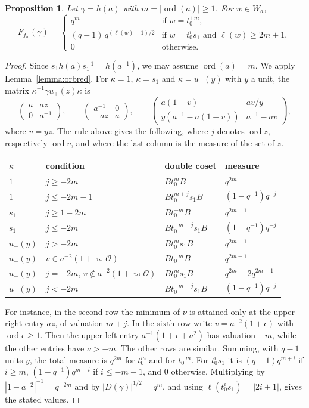 \documentclass[12pt,letterpaper]{amsart}
\numberwithin{equation}{section}
\newtheorem{proposition}[theorem]{Proposition}
\theoremstyle{definition}
\theoremstyle{remark}
\DeclareMathOperator{\ord}{ord}
\newcommand{\cO}{\mathcal{O}}
\newcommand{\mat}[4]{\begin{pmatrix} #1 & #2\\ #3 & #4\end{pmatrix}}
\begin{document}
\begin{proposition}
\label{prop:orbsl2}
Let $\gamma=h(a)$ with $m=|\ord(a)|\geq1$. For $w\in W_a$,
\[
F_{f_w}(\gamma)=
\begin{cases}
q^m & \mbox{if } w=t_0^{\pm m},\\
(q-1)\,q^{(\ell(w)-1)/2} & \mbox{if } w=t_0^is_1 \mbox{ and }
\ell(w)\geq 2m+1,\\
0 & \mbox{otherwise.}
\end{cases}
\]
\end{proposition}

\begin{proof}
Since $s_1h(a)s_1^{-1}=h(a^{-1})$, we may assume $\ord(a)=m$. We apply
Lemma~\ref{lemma:orbred}. For $\kappa=1$, $\kappa=s_1$ and
$\kappa=u_-(y)$ with $y$ a unit, the matrix
$\kappa^{-1}\gamma u_+(z)\kappa$ is
\[
\mat a{az}0{a^{-1}},\qquad \mat{a^{-1}}0{-az}a,\qquad
\mat{a(1+v)}{av/y}{y(a^{-1}-a(1+v))}{a^{-1}-av},
\]
where $v=yz$. The rule above gives the following, where $j$ denotes
$\ord z$, respectively $\ord v$, and where the last column is the
measure of the set of $z$.
\begin{center}
\begin{tabular}{@{}llll@{}}
\toprule
$\kappa$ & condition & double coset & measure \\
\midrule
$1$ & $j\geq -2m$ & $Bt_0^mB$ & $q^{2m}$ \\
$1$ & $j\leq -2m-1$ & $Bt_0^{m+j}s_1B$ & $(1-q^{-1})q^{-j}$ \\
$s_1$ & $j\geq 1-2m$ & $Bt_0^{-m}B$ & $q^{2m-1}$ \\
$s_1$ & $j\leq -2m$ & $Bt_0^{-m-j}s_1B$ & $(1-q^{-1})q^{-j}$ \\
$u_-(y)$ & $j>-2m$ & $Bt_0^ms_1B$ & $q^{2m-1}$ \\
$u_-(y)$ & $v\in a^{-2}(1+\varpi\cO)$ & $Bt_0^{-m}B$ & $q^{2m-1}$ \\
$u_-(y)$ & $j=-2m$, $v\notin a^{-2}(1+\varpi\cO)$ & $Bt_0^ms_1B$ &
$q^{2m}-2q^{2m-1}$ \\
$u_-(y)$ & $j<-2m$ & $Bt_0^{-m-j}s_1B$ & $(1-q^{-1})q^{-j}$ \\
\bottomrule
\end{tabular}
\end{center}
For instance, in the second row the minimum of $\nu$ is attained only
at the upper right entry $az$, of valuation $m+j$. In the sixth row
write $v=a^{-2}(1+\epsilon)$ with $\ord\epsilon\geq1$. Then the upper
left entry $a^{-1}(1+\epsilon+a^2)$ has valuation $-m$, while the
other entries have $\nu>-m$. The other rows are similar. Summing,
with $q-1$ units $y$, the total measure is $q^{2m}$ for $t_0^m$ and
for $t_0^{-m}$. For $t_0^is_1$ it is $(q-1)q^{m+i}$ if $i\geq m$,
$(1-q^{-1})q^{m-i}$ if $i\leq-m-1$, and $0$ otherwise. Multiplying by
$|1-a^{-2}|^{-1}=q^{-2m}$ and by $|D(\gamma)|^{1/2}=q^m$, and using
$\ell(t_0^is_1)=|2i+1|$, gives the stated values.
\end{proof}
\end{document}
